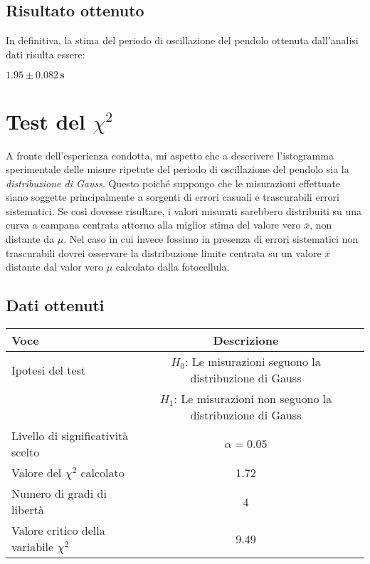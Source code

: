 \documentclass{article}
\begin{document}
\subsection{Risultato ottenuto}
In definitiva, la stima del periodo di oscillazione del pendolo ottenuta dall'analisi dati risulta essere: 
\begin{center}
$\mathbf{1.95 \pm 0.082 \, \text{s}}$
\end{center}

\section{Test del $\chi^2$}
A fronte dell'esperienza condotta, mi aspetto che a descrivere l'istogramma sperimentale delle misure ripetute del periodo di oscillazione del pendolo sia la \textit{distribuzione di Gauss}.\newline
Questo poiché suppongo che le misurazioni effettuate siano soggette principalmente a sorgenti di errori casuali e trascurabili errori sistematici. Se così dovesse risultare, i valori misurati sarebbero distribuiti su una curva a campana centrata attorno alla miglior stima del valore vero $\bar{x}$, non distante da $\mu$. \newline 
Nel caso in cui invece fossimo in presenza di errori sistematici non trascurabili dovrei osservare la distribuzione limite centrata su un valore $\bar{x}$ distante dal valor vero $\mu$ calcolato dalla fotocellula.
\newline
\subsection{Dati ottenuti}
\begin{table}[ht]
\centering
{}
\begin{tabular}{|l|c|p{10cm}|}
\hline
\textbf{Voce} & \textbf{Descrizione} \\
\hline
Ipotesi del test & \textbf{\(H_0\)}: Le misurazioni seguono la distribuzione di Gauss \\
                & \textbf{\(H_1\)}: Le misurazioni non seguono la distribuzione di Gauss \\
\hline
Livello di significatività scelto & $\alpha = 0.05$ \\
\hline
Valore del $\chi^2$ calcolato & 1.72 \\
\hline
Numero di gradi di libertà & 4 \\
\hline
Valore critico della variabile $\chi^2$ & 9.49 \\
\hline
\end{tabular}
\label{tab:chi_quadro_test}
\end{table}
\end{document}
